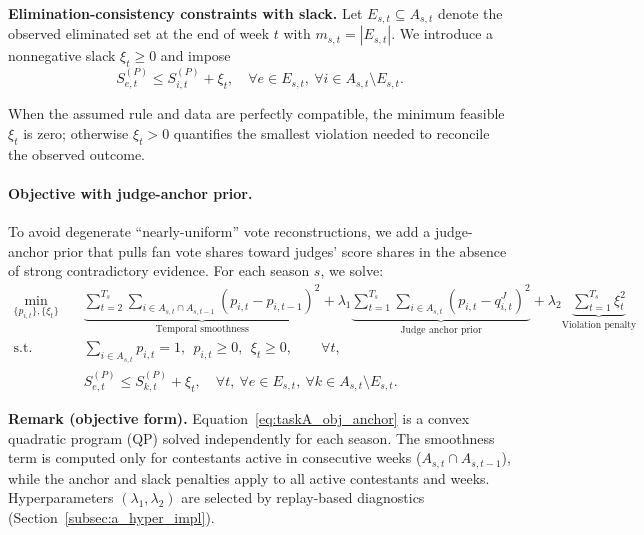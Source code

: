 \textbf{Elimination-consistency constraints with slack.}
Let $E_{s,t}\subseteq A_{s,t}$ denote the observed eliminated set at the end of week $t$ with $m_{s,t}=|E_{s,t}|$.
We introduce a nonnegative slack $\xi_t\ge 0$ and impose
\begin{equation}
S^{(P)}_{e,t}\le S^{(P)}_{i,t}+\xi_t,\quad \forall e\in E_{s,t},\ \forall i\in A_{s,t}\setminus E_{s,t}.
\end{equation}

When the assumed rule and data are perfectly compatible, the minimum feasible $\xi_t$ is zero; otherwise $\xi_t>0$ quantifies the smallest violation needed to reconcile the observed outcome.\cite{aitchison1986compositional}
\paragraph{Objective with judge-anchor prior.}
To avoid degenerate ``nearly-uniform'' vote reconstructions, we add a judge-anchor prior that pulls fan vote shares toward
judges' score shares in the absence of strong contradictory evidence. For each season $s$, we solve:
\begin{align}
\min_{\{p_{i,t}\},\{\xi_t\}} \quad
& \underbrace{\sum_{t=2}^{T_s}\sum_{i\in A_{s,t}\cap A_{s,t-1}}(p_{i,t}-p_{i,t-1})^2}_{\text{Temporal smoothness}}
+ \lambda_1 \underbrace{\sum_{t=1}^{T_s}\sum_{i\in A_{s,t}}(p_{i,t}-q^J_{i,t})^2}_{\text{Judge anchor prior}}
+ \lambda_2 \underbrace{\sum_{t=1}^{T_s}\xi_t^2}_{\text{Violation penalty}} \label{eq:taskA_obj_anchor}\\
\text{s.t.}\quad
& \sum_{i\in A_{s,t}} p_{i,t}=1,\ \ p_{i,t}\ge 0,\ \ \xi_t\ge 0, \qquad \forall t, \nonumber\\
& S^{(P)}_{e,t} \le S^{(P)}_{k,t} + \xi_t,\quad \forall t,\ \forall e\in E_{s,t},\ \forall k\in A_{s,t}\setminus E_{s,t}. \nonumber
\end{align}




\textbf{Remark (objective form).}
Equation~\eqref{eq:taskA_obj_anchor} is a convex quadratic program (QP) solved independently for each season.
The smoothness term is computed only for contestants active in consecutive weeks ($A_{s,t}\cap A_{s,t-1}$), while the anchor and slack penalties
apply to all active contestants and weeks. Hyperparameters $(\lambda_1,\lambda_2)$ are selected by replay-based diagnostics (Section~\ref{subsec:a_hyper_impl}).\cite{boyd2004convex,bubeck2015convex}

